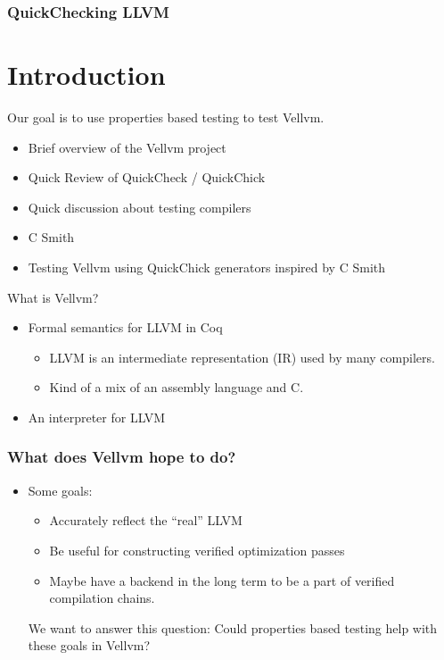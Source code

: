 \documentclass{beamer}
\author{
  Beck, Calvin\\
  \href{mailto:hobbes@seas.upenn.edu}{hobbes@seas.upenn.edu}
  \and\\~\\
  Zakowski, Yannick\\
  \href{mailto:zakowski@seas.upenn.edu}{zakowski@seas.upenn.edu}
}
\begin{document}
\begin{frame}
  \frametitle{QuickChecking LLVM}
  \maketitle
\end{frame}

\section{Introduction}

\begin{frame}

  Our goal is to use properties based testing to test Vellvm.

  \begin{itemize}
  \item Brief overview of the Vellvm project
  \item Quick Review of QuickCheck / QuickChick
  \item Quick discussion about testing compilers
  \item C Smith
  \item Testing Vellvm using QuickChick generators inspired by C Smith
  \end{itemize}
\end{frame}

\begin{frame}
  What is Vellvm?

  \begin{itemize}
  \item Formal semantics for LLVM in Coq
    \begin{itemize}
    \item LLVM is an intermediate representation (IR) used by many
      compilers.
    \item Kind of a mix of an assembly language and C.
    \end{itemize}
  \item An interpreter for LLVM
  \end{itemize}
\end{frame}

\begin{frame}
  \frametitle{What does Vellvm hope to do?}

  \begin{itemize}
  \item Some goals:
    \begin{itemize}
    \item Accurately reflect the ``real'' LLVM
    \item Be useful for constructing verified optimization passes
    \item Maybe have a backend in the long term to be a part of
      verified compilation chains.
    \end{itemize}

    We want to answer this question:
    Could properties based testing help with these goals in Vellvm?
  \end{itemize}
\end{frame}
\end{document}
